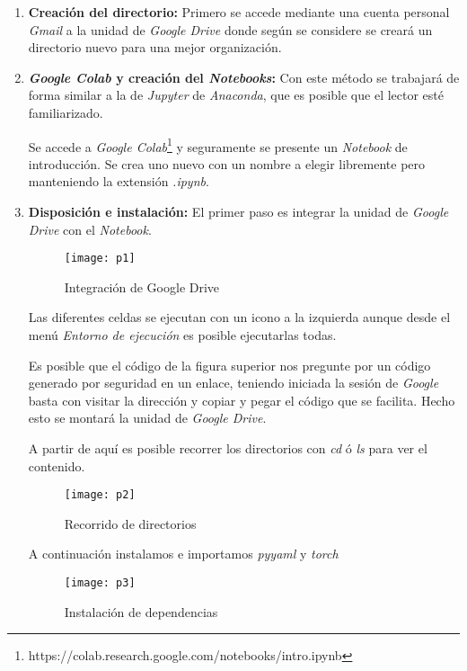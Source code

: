 \begin{enumerate}
    \item \textbf{Creación del directorio:} Primero se accede mediante una cuenta personal \emph{Gmail} a la unidad de \emph{Google Drive} donde según se considere se creará un directorio nuevo para una mejor organización.
    
    \item \textbf{\emph{Google Colab} y creación del \emph{Notebooks}:} Con este método se trabajará de forma similar a la de \emph{Jupyter} de \emph{Anaconda}, que es posible que el lector esté familiarizado.
    
    Se accede a \emph{Google Colab}\footnote{https://colab.research.google.com/notebooks/intro.ipynb} y seguramente se presente un \emph{Notebook} de introducción. Se crea uno nuevo con un nombre a elegir libremente pero manteniendo la extensión \emph{.ipynb}.
    
    \item \textbf{Disposición e instalación:} El primer paso es integrar la unidad de \emph{Google Drive} con el \emph{Notebook}.
    
    \begin{figure}[htb]
	\centering
	\texttt{[image: p1]}
	\caption[Integración de Google Drive]{Integración de Google Drive}
    \end{figure}
    
    Las diferentes celdas se ejecutan con un icono a la izquierda aunque desde el menú \emph{Entorno de ejecución} es posible ejecutarlas todas.
    
    Es posible que el código de la figura superior nos pregunte por un código generado por seguridad en un enlace, teniendo iniciada la sesión de \emph{Google} basta con visitar la dirección y copiar y pegar el código que se facilita. Hecho esto se montará la unidad de \emph{Google Drive}.
    
    A partir de aquí es posible recorrer los directorios con \emph{cd} ó \emph{ls} para ver el contenido.
    
    \begin{figure}[htb]
	\centering
	\texttt{[image: p2]}
	\caption[Recorrido de directorios]{Recorrido de directorios}
    \end{figure}
    
    A continuación instalamos e importamos \emph{pyyaml} y \emph{torch}
    
    \begin{figure}[htb]
	\centering
	\texttt{[image: p3]}
	\caption[Instalación de dependencias]{Instalación de dependencias}
    \end{figure}
    

\end{enumerate}
